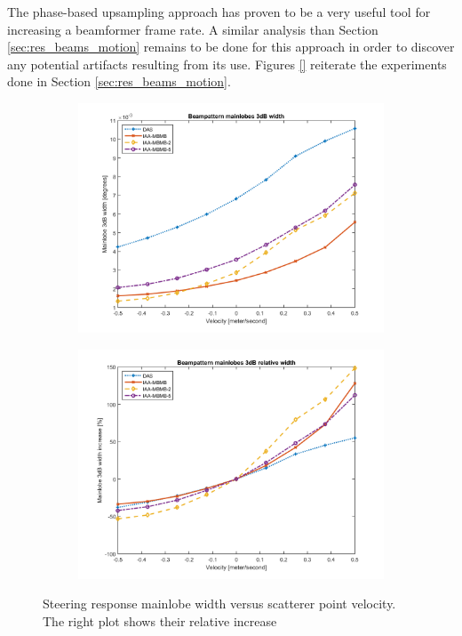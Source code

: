 The phase-based upsampling approach has proven to be a very useful tool for increasing a beamformer frame rate. 
A similar analysis than Section \ref{sec:res_beams_motion} remains to be done for this approach in order to discover any potential artifacts resulting from its use. Figures \ref{} reiterate the experiments done in Section \ref{sec:res_beams_motion}.

\begin{figure}[ht]
    \centering
    \begin{subfigure}[t]{0.48\linewidth}
        \includegraphics[width=\linewidth]{./images/discussion/mainlobe_vs_speed.png}
    \end{subfigure}
    \quad
    \begin{subfigure}[t]{0.48\linewidth}
        \includegraphics[width=\linewidth]{./images/discussion/mainlobe_vs_speed_relative.png}
    \end{subfigure}
	\caption{Steering  response  mainlobe  width  versus  scatterer  point velocity. The right plot shows their relative increase}
	\label{fig:mainlobe_vs_speed_upsample}
\end{figure}

